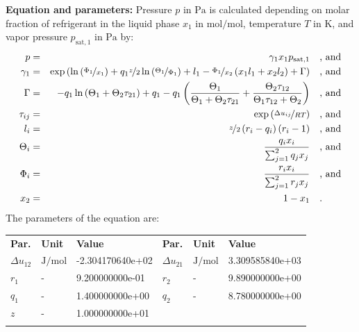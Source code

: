 \textbf{Equation and parameters:}
\newline
%
Pressure $p$ in $\si{\pascal}$ is calculated depending on molar fraction of refrigerant in the liquid phase $x_1$ in $\si{\mole\per\mole}$, temperature $T$ in $\si{\kelvin}$, and vapor pressure $p_\mathrm{sat,1}$ in $\si{\pascal}$ by:
%
\begin{equation*}
\begin{split}
p &=& \gamma_1 x_1 p_\mathrm{sat,1} & \quad\text{, and} \\
\gamma_1 &=& \exp \left( \ln \left( \nicefrac{\Phi_1}{x_1} \right) + q_1 \nicefrac{z}{2} \ln \left( \nicefrac{\Theta_1}{\Phi_1} \right) + l_1 - \nicefrac{\Phi_1}{x_2} \left( x_1 l_1 + x_2 l_2 \right) + \Gamma \right) & \quad\text{, and} \\
\Gamma &=& - q_1 \ln \left( \Theta_1 + \Theta_2 \tau_{21} \right) + q_1 - q_1 \left( \frac{\Theta_1}{\Theta_1 + \Theta_2 \tau_{21}} + \frac{\Theta_2 \tau_{12}}{\Theta_1 \tau_{12} + \Theta_2} \right) & \quad\text{, and} \\
\tau_{ij} &=& \exp \left( \nicefrac{\Delta u_{ij}}{R T} \right) & \quad\text{, and} \\
l_i &=& \nicefrac{z}{2} \left( r_i - q_i \right) \left(r_i - 1 \right) & \quad\text{, and} \\
\Theta_i &=& \frac{q_i x_i}{\sum_{j=1}^{2} q_j x_j} & \quad\text{, and} \\
\Phi_i &=& \frac{r_i x_i}{\sum_{j=1}^{2} r_j x_j} & \quad\text{, and} \\
x_2 &=& 1 - x_1  & \quad\text{.} \\
\end{split}
\end{equation*}
%
The parameters of the equation are:
%
\begin{longtable}[l]{lll|lll}
\toprule
\addlinespace
\textbf{Par.} & \textbf{Unit} & \textbf{Value} &	\textbf{Par.} & \textbf{Unit} & \textbf{Value} \\
\addlinespace
\midrule
\endhead

\bottomrule
\endfoot
\bottomrule
\endlastfoot
\addlinespace

$\Delta u_{12}$ & $\si{\joule\per\mole}$ & -2.304170640e+02 & $\Delta u_{21}$ & $\si{\joule\per\mole}$ & 3.309585840e+03 \\
$r_{1}$ & - & 9.200000000e-01 & $r_{2}$ & - & 9.890000000e+00 \\
$q_{1}$ & - & 1.400000000e+00 & $q_{2}$ & - & 8.780000000e+00 \\
$z$ & - & 1.000000000e+01 & & &  \\

\addlinespace\end{longtable}

